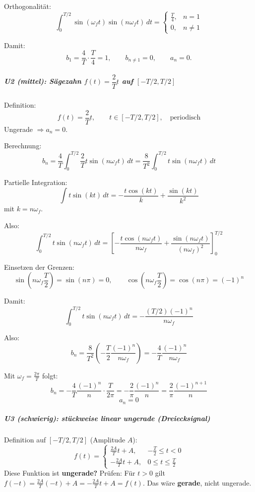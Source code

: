 Orthogonalität:
\[
\int_0^{T/2}\sin(\omega_f t)\sin(n\omega_f t)\,dt=
\begin{cases}
\frac{T}{4}, & n=1\\
0, & n\neq 1
\end{cases}
\]

Damit:
\[
\boxed{b_1=\frac{4}{T}\cdot\frac{T}{4}=1},
\qquad
\boxed{b_{n\neq 1}=0},
\qquad
\boxed{a_n=0}.
\]

\subparagraph{U2 (mittel): Sägezahn $f(t)=\dfrac{2}{T}t$ auf $[-T/2,T/2]$}

Definition:
\[
f(t)=\frac{2}{T}t,\qquad t\in[-T/2,T/2],\quad \text{periodisch}
\]
Ungerade $\Rightarrow a_n=0$.

Berechnung:
\[
b_n=\frac{4}{T}\int_0^{T/2}\frac{2}{T}t\sin(n\omega_f t)\,dt
=\frac{8}{T^2}\int_0^{T/2} t\sin(n\omega_f t)\,dt
\]

Partielle Integration:
\[
\int t\sin(kt)\,dt=-\frac{t\cos(kt)}{k}+\frac{\sin(kt)}{k^2}
\]
mit $k=n\omega_f$.

Also:
\[
\int_0^{T/2} t\sin(n\omega_f t)\,dt=
\left[-\frac{t\cos(n\omega_f t)}{n\omega_f}+\frac{\sin(n\omega_f t)}{(n\omega_f)^2}\right]_0^{T/2}
\]

Einsetzen der Grenzen:
\[
\sin\!\left(n\omega_f \frac{T}{2}\right)=\sin(n\pi)=0,
\qquad
\cos\!\left(n\omega_f \frac{T}{2}\right)=\cos(n\pi)=(-1)^n
\]

Damit:
\[
\int_0^{T/2} t\sin(n\omega_f t)\,dt
=
-\frac{(T/2)(-1)^n}{n\omega_f}
\]

Also:
\[
b_n=\frac{8}{T^2}\left(-\frac{T}{2}\frac{(-1)^n}{n\omega_f}\right)
=-\frac{4}{T}\frac{(-1)^n}{n\omega_f}
\]

Mit $\omega_f=\frac{2\pi}{T}$ folgt:
\[
\boxed{
b_n=-\frac{4}{T}\frac{(-1)^n}{n}\cdot\frac{T}{2\pi}
=
-\frac{2}{\pi}\frac{(-1)^n}{n}
=
\frac{2}{\pi}\frac{(-1)^{n+1}}{n}
}
\]
\[
\boxed{a_n=0}
\]

\subparagraph{U3 (schwierig): stückweise linear ungerade (Dreiecksignal)}

Definition auf $[-T/2,T/2]$ (Amplitude $A$):
\[
f(t)=
\begin{cases}
\frac{2A}{T}t + A, & -\frac{T}{2}\le t < 0\\[4pt]
-\frac{2A}{T}t + A, & 0\le t \le \frac{T}{2}
\end{cases}
\]
Diese Funktion ist \textbf{ungerade?} Prüfen:
Für $t>0$ gilt $f(-t)=\frac{2A}{T}(-t)+A = -\frac{2A}{T}t + A = f(t)$.
Das wäre \textbf{gerade}, nicht ungerade.

